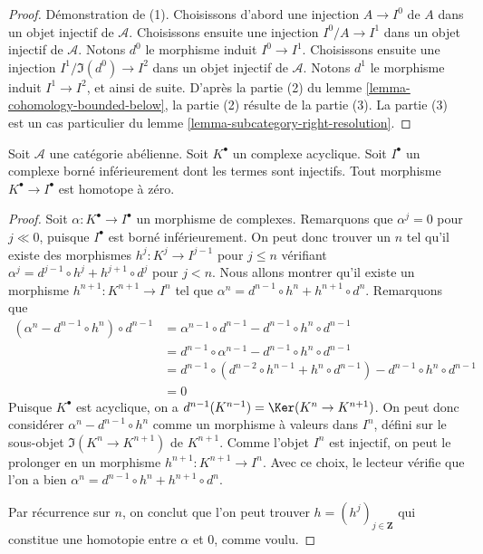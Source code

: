 \begin{proof}
Démonstration de (1). Choisissons d'abord une injection $A \to I^0$ de $A$
dans un objet injectif de $\mathcal{A}$. Choisissons ensuite une injection
$I^0/A \to I^1$ dans un objet injectif de $\mathcal{A}$. Notons $d^0$ le
morphisme induit $I^0 \to I^1$. Choisissons ensuite une injection
$I^1/\Im(d^0) \to I^2$ dans un objet injectif de $\mathcal{A}$. Notons $d^1$
le morphisme induit $I^1 \to I^2$, et ainsi de suite. D'après la partie (2) du
lemme \ref{lemma-cohomology-bounded-below}, la partie (2) résulte de la partie
(3). La partie (3) est un cas particulier du
lemme \ref{lemma-subcategory-right-resolution}.
\end{proof}

\begin{lemma}
\label{lemma-acyclic-is-zero}
Soit $\mathcal{A}$ une catégorie abélienne. Soit $K^\bullet$ un complexe
acyclique. Soit $I^\bullet$ un complexe borné inférieurement dont les termes
sont injectifs. Tout morphisme $K^\bullet \to I^\bullet$ est homotope à zéro.
\end{lemma}

\begin{proof}
Soit $\alpha : K^\bullet \to I^\bullet$ un morphisme de complexes. Remarquons
que $\alpha^j = 0$ pour $j \ll 0$, puisque $I^\bullet$ est borné
inférieurement. On peut donc trouver un $n$ tel qu'il existe des morphismes
$h^j :  K^j \to I^{j - 1}$ pour $j \leq n$ vérifiant
$\alpha^j = d^{j - 1} \circ h^j + h^{j + 1} \circ d^j$ pour $j < n$. Nous
allons montrer qu'il existe un morphisme
$h^{n + 1} : K^{n + 1} \to I^n$ tel que
$\alpha^n = d^{n - 1} \circ h^n + h^{n + 1} \circ d^n$. Remarquons que
\begin{align*}
(\alpha^n - d^{n - 1} \circ h^n) \circ d^{n - 1}
& =
\alpha^{n - 1} \circ d^{n - 1} - d^{n - 1} \circ h^n \circ d^{n - 1} \\
& =
d^{n - 1} \circ \alpha^{n - 1} - d^{n - 1} \circ h^n \circ d^{n - 1} \\
& =
d^{n - 1} \circ (d^{n - 2} \circ h^{n - 1} + h^n \circ d^{n - 1})
- d^{n - 1} \circ h^n \circ d^{n - 1} \\
& = 0
\end{align*}
Puisque $K^\bullet$ est acyclique, on a
$d^{n - 1}(K^{n - 1}) = \Ker(K^n \to K^{n + 1})$. On peut donc considérer
$\alpha^n -  d^{n - 1} \circ h^n$ comme un morphisme à valeurs dans $I^n$,
défini sur le sous-objet $\Im(K^n \to K^{n + 1})$ de $K^{n + 1}$. Comme
l'objet $I^n$ est injectif, on peut le prolonger en un morphisme
$h^{n + 1} : K^{n + 1} \to I^n$. Avec ce choix, le lecteur vérifie que l'on a
bien $\alpha^n = d^{n - 1} \circ h^n + h^{n + 1} \circ d^n$.

\medskip\noindent
Par récurrence sur $n$, on conclut que l'on peut trouver
$h  = (h^j)_{j \in \mathbf{Z}}$ qui constitue une homotopie entre $\alpha$ et
$0$, comme voulu.
\end{proof}

